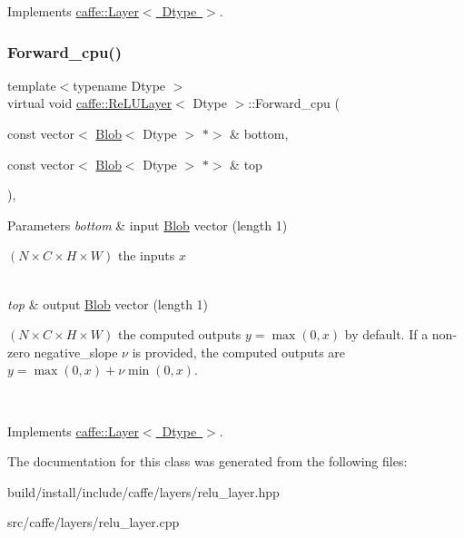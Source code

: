 Implements \mbox{\hyperlink{classcaffe_1_1_layer_a576ac6a60b1e99fe383831f52a6cea77}{caffe\+::\+Layer$<$ Dtype $>$}}.

\mbox{\label{classcaffe_1_1_re_l_u_layer_a484e59dd846dfa3e40030bb7ce97cdbb}} 
\subsubsection{\texorpdfstring{Forward\+\_\+cpu()}{Forward\_cpu()}\hspace{0.1cm}{\footnotesize\ttfamily [2/2]}}
{\footnotesize\ttfamily template$<$typename Dtype $>$ \\
virtual void \mbox{\hyperlink{classcaffe_1_1_re_l_u_layer}{caffe\+::\+Re\+L\+U\+Layer}}$<$ Dtype $>$\+::Forward\+\_\+cpu (\begin{DoxyParamCaption}\item[{const vector$<$ \mbox{\hyperlink{classcaffe_1_1_blob}{Blob}}$<$ Dtype $>$ $\ast$$>$ \&}]{bottom,  }\item[{const vector$<$ \mbox{\hyperlink{classcaffe_1_1_blob}{Blob}}$<$ Dtype $>$ $\ast$$>$ \&}]{top }\end{DoxyParamCaption})\hspace{0.3cm}{\ttfamily [protected]}, {\ttfamily [virtual]}}


\begin{DoxyParams}{Parameters}
{\em bottom} & input \mbox{\hyperlink{classcaffe_1_1_blob}{Blob}} vector (length 1)
\begin{DoxyEnumerate}
\item $ (N \times C \times H \times W) $ the inputs $ x $ 
\end{DoxyEnumerate}\\
\hline
{\em top} & output \mbox{\hyperlink{classcaffe_1_1_blob}{Blob}} vector (length 1)
\begin{DoxyEnumerate}
\item $ (N \times C \times H \times W) $ the computed outputs $ y = \max(0, x) $ by default. If a non-\/zero negative\+\_\+slope $ \nu $ is provided, the computed outputs are $ y = \max(0, x) + \nu \min(0, x) $. 
\end{DoxyEnumerate}\\
\hline
\end{DoxyParams}


Implements \mbox{\hyperlink{classcaffe_1_1_layer_a576ac6a60b1e99fe383831f52a6cea77}{caffe\+::\+Layer$<$ Dtype $>$}}.



The documentation for this class was generated from the following files\+:\begin{DoxyCompactItemize}
\item 
build/install/include/caffe/layers/relu\+\_\+layer.\+hpp\item 
src/caffe/layers/relu\+\_\+layer.\+cpp\end{DoxyCompactItemize}

